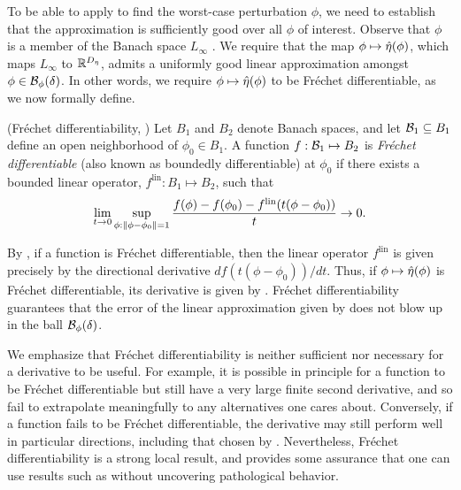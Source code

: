 To be able to apply  to find the worst-case
perturbation $\phi$, we need to establish that the approximation is sufficiently
good over all $\phi$ of interest. Observe that $\phi$ is a member of the Banach
space $L_\infty$ \citep[Theorem 5.2.1]{dudley:2018:real}.  We require that the
map $\phi \mapsto \hat\eta(\phi)$, which maps $L_\infty$ to $\mathbb{R}^{D_{\eta}}$,
admits a uniformly good linear approximation amongst $\phi \in
\mathcal{B}_\phi(\delta)$. In other words, we require $\phi \mapsto \hat\eta(\phi)$ to
be Fr{\'e}chet differentiable, as we now formally define.

\begin{defn}
    (Fr{\'e}chet differentiability,
    \citep[Definition 4.5]{zeidler:2013:functional})
%
Let $B_1$ and $B_2$ denote Banach spaces, and let $\mathcal{B}_1 \subseteq B_1$ define
an open neighborhood of $\phi_0 \in B_1$.
%
A function $f: \mathcal{B}_1 \mapsto B_2$ is {\em Fr{\'echet} differentiable} (also
known as boundedly differentiable) at $\phi_0$ if there exists a  bounded linear
operator, $f^{\mathrm{lin}}: B_1 \mapsto B_2$, such that
%
\begin{align*}
%
\lim_{t \rightarrow 0}
    \sup_{\phi: \norm{\phi - \phi_0} = 1}
    \frac{f(\phi) - f(\phi_0) -
          f^{\mathrm{lin}}(t (\phi - \phi_0))
         }{t} \rightarrow 0.
%
\end{align*}
%
\end{defn}

By \citep[Proposition 4.8]{zeidler:2013:functional}, if a function is
Fr{\'e}chet differentiable, then the linear operator $f^{\mathrm{lin}}$ is given
precisely by the directional derivative $d f(t (\phi - \phi_0)) / d t$. Thus, if
$\phi \mapsto \hat\eta(\phi)$ is Fr{\'e}chet differentiable, its derivative is
given by .  Fr{\'e}chet differentiability guarantees
that the error of the linear approximation given by 
does not blow up in the ball $\mathcal{B}_\phi(\delta)$.

We emphasize that Fr{\'e}chet differentiability is neither sufficient nor
necessary for a derivative to be useful.  For example, it is possible in
principle for a function to be Fr{\'e}chet differentiable but still have a very
large finite second derivative, and so fail to extrapolate meaningfully to any
alternatives one cares about.  Conversely, if a function fails to be Fr{\'e}chet
differentiable, the derivative may still perform well in particular directions,
including that chosen by .  Nevertheless, Fr{\'e}chet
differentiability is a strong local result, and provides some assurance that one
can use results such as  without uncovering
pathological behavior.

